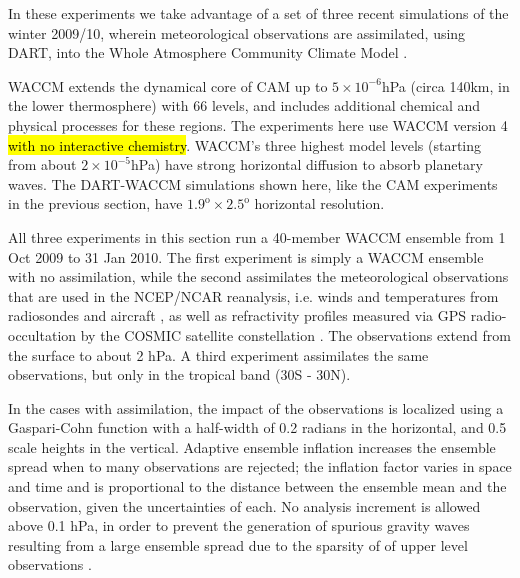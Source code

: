 In these experiments we take advantage of a set of three recent simulations of the winter 2009/10, wherein meteorological observations are assimilated, using DART, into the Whole Atmosphere Community Climate Model \citep[WACCM][]{Marsh2013}. 

WACCM extends the dynamical core of CAM up to $5 \times 10^{-6}$hPa (circa 140km, in the lower thermosphere) with 66 levels, and includes additional chemical and physical processes for these regions. 
The experiments here use WACCM version 4 \hl{with no interactive chemistry}.
WACCM's three highest model levels (starting from about $2 \times 10^{-5}$hPa) have strong horizontal diffusion to absorb planetary waves. 
The DART-WACCM simulations shown here, like the CAM experiments in the previous section, have $1.9^{\text{o}} \times 2.5^{\text{o}}$ horizontal resolution.


All three experiments in this section 
run a 40-member WACCM ensemble from 1 Oct 2009 to 31 Jan 2010. 
The first experiment is simply a WACCM ensemble with no assimilation, while the second 
assimilates the meteorological observations that are used in the NCEP/NCAR reanalysis, i.e. winds and temperatures from radiosondes and aircraft \citep{Saha2010}, as well as refractivity profiles measured via GPS radio-occultation by the COSMIC satellite constellation \citep{Anthes2008}.
The observations extend from the surface to about 2 hPa. 
A third experiment assimilates the same observations, but only in the tropical band (30S - 30N). 

In the cases with assimilation, the impact of the observations is localized using a  
Gaspari-Cohn function \citep{Gaspari1999} with a half-width of 0.2 radians in the horizontal, and 0.5 scale heights in the vertical.  
Adaptive ensemble inflation \citep{Anderson2009tellus} increases the ensemble spread when to many observations are rejected; the inflation factor varies in space and time and is proportional to the distance between the ensemble mean and the observation, given the uncertainties of each.  
No analysis increment is allowed above 0.1 hPa, in order to prevent the generation of spurious gravity waves resulting from a large ensemble spread due to the sparsity of of upper level observations \citep{Polavarapu2005b}. 


